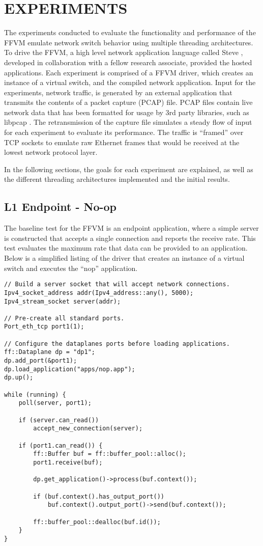 \chapter{EXPERIMENTS}
\label{expr}
The experiments conducted to evaluate the functionality and performance of the FFVM emulate network switch behavior using multiple threading architectures.
To drive the FFVM, a high level network application language called Steve 
\cite{steve}, developed in collaboration with a fellow research associate,
provided the hosted applications. Each experiment is comprised of a FFVM 
driver, which creates an instance of a virtual switch, and the compiled network
application. Input for the experiments, network traffic, is generated by an 
external application that transmits the contents of a packet capture (PCAP) 
file. PCAP files contain live network data that has been formatted for usage
by 3rd party libraries, such as libpcap \cite{libpcap}. The retransmission of
the capture file simulates a steady flow of input for each experiment to 
evaluate its performance. The traffic is ``framed'' over TCP sockets to 
emulate raw Ethernet frames that would be received at the lowest network 
protocol layer.

In the following sections, the goals for each experiment are 
explained, as well as the different threading architectures implemented and 
the initial results.

\section{L1 Endpoint - No-op}
\label{expr:slurp}
The baseline test for the FFVM is an endpoint application, where a simple
server is constructed that accepts a single connection and reports the 
receive rate. This test evaluates the maximum rate that data can be provided
to an application. Below is a simplified listing of the driver that creates
an instance of a virtual switch and executes the ``nop'' application.

\begin{lstlisting}
// Build a server socket that will accept network connections.
Ipv4_socket_address addr(Ipv4_address::any(), 5000);
Ipv4_stream_socket server(addr);

// Pre-create all standard ports.
Port_eth_tcp port1(1);

// Configure the dataplanes ports before loading applications.
ff::Dataplane dp = "dp1";
dp.add_port(&port1);
dp.load_application("apps/nop.app");
dp.up();

while (running) {
	poll(server, port1);

	if (server.can_read())
		accept_new_connection(server);
	
	if (port1.can_read()) {
		ff::Buffer buf = ff::buffer_pool::alloc();
		port1.receive(buf);
		
		dp.get_application()->process(buf.context());
		
		if (buf.context().has_output_port())
			buf.context().output_port()->send(buf.context());

		ff::buffer_pool::dealloc(buf.id());
	}
}
\end{lstlisting}


